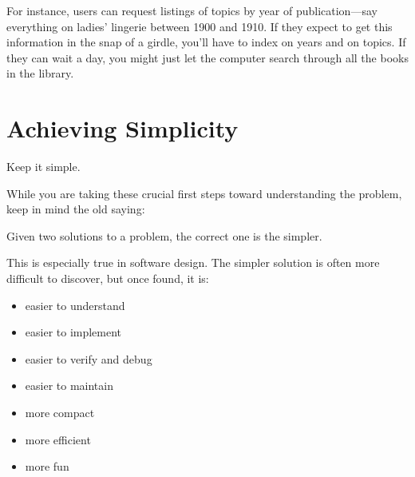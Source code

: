 For instance, users can request listings of topics by year of
publication---say everything on ladies' lingerie between 1900 and
1910.  If they expect to get this information in the snap of a girdle,
you'll have to index on years and on topics. If they can wait a day,
you might just let the computer search through all the books in the
library.

\section{Achieving Simplicity}

\begin{tip}
Keep it simple.
\end{tip}

\noindent While you are taking these crucial first steps toward
understanding the problem, keep in mind the old saying:

\begin{tfquot}
Given two solutions to a problem, the correct one is the simpler.
\end{tfquot}
This is especially true in software design. The simpler solution is often
more difficult to discover, but once found, it is:

\begin{itemize}
\item easier to understand
\item easier to implement
\item easier to verify and debug
\item easier to maintain
\item more compact
\item more efficient
\item more fun
\end{itemize}

